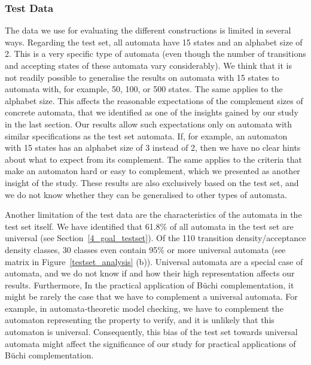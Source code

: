 \subsubsection{Test Data}
The data we use for evaluating the different constructions is limited in several ways. Regarding the \goal{} test set, all automata have 15 states and an alphabet size of 2. This is a very specific type of automata (even though the number of transitions and accepting states of these automata vary considerably). We think that it is not readily possible to generalise the results on automata with 15 states to automata with, for example, 50, 100, or 500 states. The same applies to the alphabet size. This affects the reasonable expectations of the complement sizes of concrete automata, that we identified as one of the insights gained by our study in the last section. Our results allow such expectations only on automata with similar specifications as the \goal{} test set automata. If, for example, an automaton with 15 states has an alphabet size of 3 instead of 2, then we have no clear hints about what to expect from its complement. The same applies to the criteria that make an automaton hard or easy to complement, which we presented as another insight of the study. These results are also exclusively based on the \goal{} test set, and we do not know whether they can be generalised to other types of automata.

Another limitation of the test data are the characteristics of the automata in the \goal{} test set itself. We have identified that 61.8\% of all automata in the \goal{} test set are universal (see Section~\ref{4_goal_testset}). Of the 110 transition density/acceptance density classes, 30 classes even contain 95\% or more universal automata (see matrix in Figure~\ref{testset_analysis} (b)). Universal automata are a special case of automata, and we do not know if and how their high representation affects our results. Furthermore, In the practical application of Büchi complementation, it might be rarely the case that we have to complement a universal automata. For example, in automata-theoretic model checking, we have to complement the automaton representing the property to verify, and it is unlikely that this automaton is universal. Consequently, this bias of the \goal{} test set towards universal automata might affect the significance of our study for practical applications of Büchi complementation.


